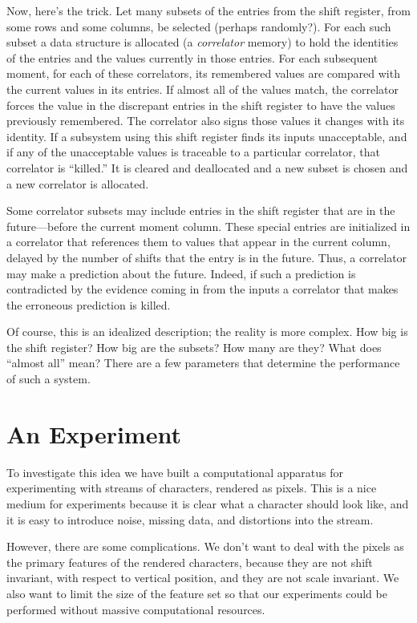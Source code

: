\documentclass[letterpaper]{article}
\begin{document}
Now, here's the trick.  Let many subsets of the entries from the shift
register, from some rows and some columns, be selected (perhaps
randomly?).  For each such subset a data structure is allocated (a
{\em correlator} memory) to hold the identities of the entries and the
values currently in those entries.  For each subsequent moment, for
each of these correlators, its remembered values are compared with the
current values in its entries.  If almost all of the values match, the
correlator forces the value in the discrepant entries in the shift
register to have the values previously remembered.  The correlator
also signs those values it changes with its identity.  If a subsystem
using this shift register finds its inputs unacceptable, and if any of
the unacceptable values is traceable to a particular correlator, that
correlator is ``killed.''  It is cleared and deallocated and a new subset
is chosen and a new correlator is allocated.

Some correlator subsets may include entries in the shift register that
are in the future---before the current moment column.  These special
entries are initialized in a correlator that references them to values
that appear in the current column, delayed by the number of shifts
that the entry is in the future.  Thus, a correlator may make a
prediction about the future.  Indeed, if such a prediction is
contradicted by the evidence coming in from the inputs a correlator
that makes the erroneous prediction is killed.

Of course, this is an idealized description; the reality is more
complex.  How big is the shift register?  How big are the subsets?
How many are they?  What does ``almost all'' mean?  There are a few
parameters that determine the performance of such a system.


\section{An Experiment}

To investigate this idea we have built a computational apparatus for
experimenting with streams of characters, rendered as pixels.  This is
a nice medium for experiments because it is clear what a character
should look like, and it is easy to introduce noise, missing data, and
distortions into the stream.  

However, there are some complications.  We don't want to deal with the
pixels as the primary features of the rendered characters, because
they are not shift invariant, with respect to vertical position, and
they are not scale invariant.  We also want to limit the size of the
feature set so that our experiments could be performed without massive
computational resources.
\end{document}
